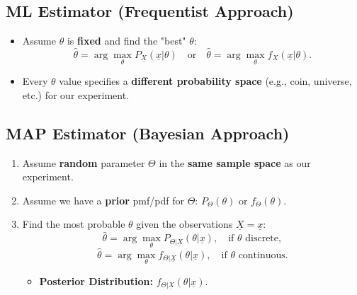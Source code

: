 \begin{faq}

\end{faq}

\subsection{ML Estimator (Frequentist Approach)}
\begin{definition}
    \begin{itemize}
        \item Assume $\theta$ is \textbf{fixed} and find the "best" $\theta$:
        \[
        \hat{\theta} = \arg\max_{\theta} P_{\underline{X}}(\underline{x}|\theta) \quad \text{or} \quad \hat{\theta} = \arg\max_{\theta} f_{\underline{X}}(\underline{x}|\theta).
        \]
        \item Every $\theta$ value specifies a \textbf{different probability space} (e.g., coin, universe, etc.) for our experiment.
    \end{itemize}
\end{definition}

\subsection{MAP Estimator (Bayesian Approach)}
\begin{definition}
    \begin{enumerate}
        \item Assume \textbf{random} parameter $\Theta$ in the \textbf{same sample space} as our experiment.
        \item Assume we have a \textbf{prior} pmf/pdf for $\Theta$: $P_\Theta(\theta)$ or $f_\Theta(\theta)$.
        \item Find the most probable $\theta$ given the observations $\underline{X} = \underline{x}$:
        \[
        \hat{\theta} = \arg\max_{\theta} P_{\Theta|\underline{X}}(\theta|\underline{x}), \quad \text{if } \theta \text{ discrete},
        \]
        \[
        \hat{\theta} = \arg\max_{\theta} f_{\Theta|\underline{X}}(\theta|\underline{x}), \quad \text{if } \theta \text{ continuous}.
        \]
        \begin{itemize}
            \item \textbf{Posterior Distribution:} $f_{\Theta|\underline{X}} (\theta|\underline{x})$.
        \end{itemize}
    \end{enumerate}
\end{definition}

